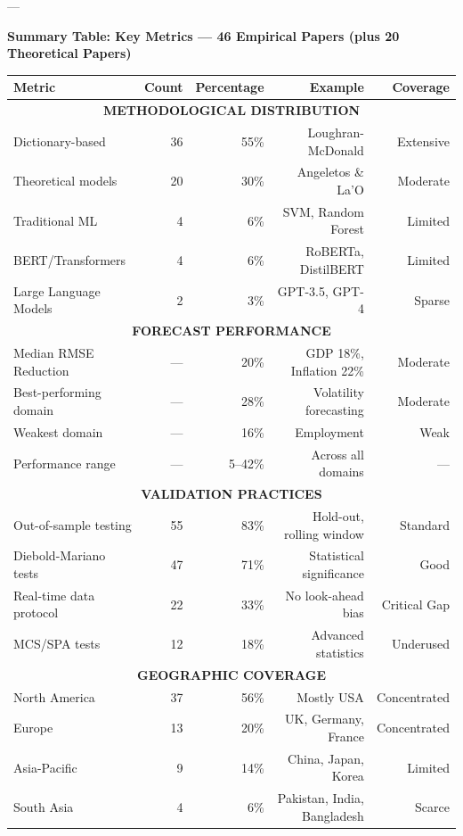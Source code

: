 \documentclass[11pt]{article}
\begin{document}
---

\noindent\textbf{Summary Table: Key Metrics — 46 Empirical Papers (plus 20 Theoretical Papers)}

\begin{table}[htbp]
\centering \small
\begin{tabular}{|l|r|r|r|r|}
\hline
\textbf{Metric} & \textbf{Count} & \textbf{Percentage} & \textbf{Example} & \textbf{Coverage} \\
\hline
\multicolumn{5}{|c|}{\textbf{METHODOLOGICAL DISTRIBUTION}} \\
\hline
Dictionary-based & 36 & 55\% & Loughran-McDonald & Extensive \\
Theoretical models & 20 & 30\% & Angeletos \& La'O & Moderate \\
Traditional ML & 4 & 6\% & SVM, Random Forest & Limited \\
BERT/Transformers & 4 & 6\% & RoBERTa, DistilBERT & Limited \\
Large Language Models & 2 & 3\% & GPT-3.5, GPT-4 & Sparse \\
\hline
\multicolumn{5}{|c|}{\textbf{FORECAST PERFORMANCE}} \\
\hline
Median RMSE Reduction & — & 20\% & GDP 18\%, Inflation 22\% & Moderate \\
Best-performing domain & — & 28\% & Volatility forecasting & Moderate \\
Weakest domain & — & 16\% & Employment & Weak \\
Performance range & — & 5--42\% & Across all domains & — \\
\hline
\multicolumn{5}{|c|}{\textbf{VALIDATION PRACTICES}} \\
\hline
Out-of-sample testing & 55 & 83\% & Hold-out, rolling window & Standard \\
Diebold-Mariano tests & 47 & 71\% & Statistical significance & Good \\
Real-time data protocol & 22 & 33\% & No look-ahead bias & Critical Gap \\
MCS/SPA tests & 12 & 18\% & Advanced statistics & Underused \\
\hline
\multicolumn{5}{|c|}{\textbf{GEOGRAPHIC COVERAGE}} \\
\hline
North America & 37 & 56\% & Mostly USA & Concentrated \\
Europe & 13 & 20\% & UK, Germany, France & Concentrated \\
Asia-Pacific & 9 & 14\% & China, Japan, Korea & Limited \\
South Asia & 4 & 6\% & Pakistan, India, Bangladesh & Scarce \\

\end{tabular}
\end{table}
\end{document}
